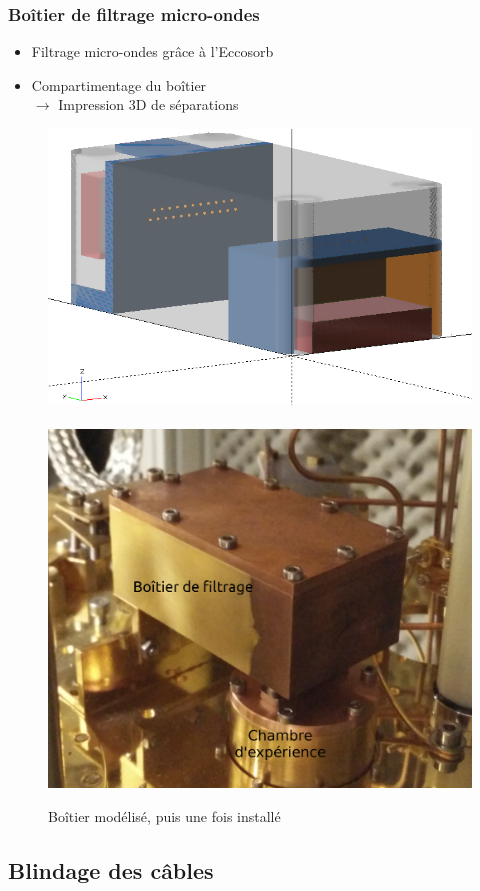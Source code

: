 \documentclass[10pt,a9paper,handout]{beamer} \usepackage[utf8]{inputenc} \usepackage[francais]{babel} \usepackage[T1]{fontenc}
\begin{document}
\begin{frame}
\frametitle{Boîtier de filtrage micro-ondes}

\begin{itemize}
    \item Filtrage micro-ondes grâce à l'Eccosorb
    \vspace*{2mm}
    \item Compartimentage du boîtier\\
    \hspace*{1cm} $\rightarrow$ Impression 3D de séparations
\end{itemize}
\vspace*{3mm}
\begin{figure}[h]
    \centering
    \includegraphics[height=0.25\textwidth]{Images/Thermalisation/Filtrage3D}
    ~ 
    \includegraphics[height=0.25\textwidth]{Images/Thermalisation/Filtrage}
    \caption{Boîtier modélisé, puis une fois installé}
\end{figure}
\end{frame}

\subsection{Blindage des câbles}
\end{document}

